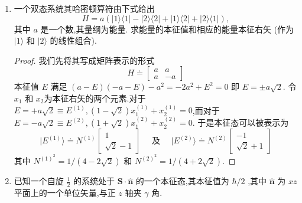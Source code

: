 \begin{enumerate}
$$	$$
	其中
	$$
	{S}_{x} = \frac{\hbar }{2}\left( {\left| {+\rangle \langle - }\right| + \left| {-\rangle \langle + }\right| }\right) ,\;{S}_{y} = \frac{i\hbar }{2}\left( {-\left| {+\rangle \langle - }\right| + \left| {-\rangle \langle + }\right| }\right) ,
	{S}_{z} = \frac{\hbar }{2}\left( {\left| {+\rangle \langle + }\right| - \left| {-\rangle \langle - }\right| }\right) .
	$$
	\begin{proof}
		本题仅需要理解各个符号的含义并带入即可,一个可以有一定作用的方法是令$\langle +|-\rangle=\langle -|+\rangle=0,\langle +|+\rangle=\langle -|-\rangle=1$,这样可以减少其中的运算量.
	\end{proof}
	\item 一个双态系统其哈密顿算符由下式给出
	$$
	H = a\left( {\left| {1\rangle \langle 1}\right| - \left| {2\rangle \langle 2}\right| + \left| {1\rangle \langle 2}\right| + \left| {2\rangle \langle 1}\right| }\right) ,
	$$
	其中 $a$ 是一个数,其量纲为能量. 求能量的本征值和相应的能量本征右矢 (作为 $|1\rangle$ 和 $|2\rangle$ 的线性组合).
	\begin{proof}	
		我们先将其写成矩阵表示的形式
		\begin{equation}
			H\doteq\left[\begin{array}{rr}a&a\\a&-a\end{array}\right]
		\end{equation}
		本征值 $E$ 满足 $( a- E) ( - a- E) - a^2= - 2a^2+ E^2= 0$ 即 $E= \pm a\sqrt {2}.$ 令$x_1$ 和 $x_2$为本征右矢的两个元素.对于$E=+a\sqrt{2}\equiv E^{(1)},(1-\sqrt{2})x_{1}^{(1)}+x_{2}^{(1)}=0$,而对于$E=-a\sqrt2\equiv E^{(2)},(1+\sqrt2)x_1^{(2)}+x_2^{(2)}=0.$ 于是本征态可以被表示为
		\begin{equation}
			\left.|E^{(1)}\rangle\doteq N^{(1)}\left[\begin{array}{c}1\\\sqrt{2}-1\end{array}\right.\right]\quad\text{ 及 }\quad|E^{(2)}\rangle\doteq N^{(2)}\left[\begin{array}{c}-1\\\sqrt{2}+1\end{array}\right]
		\end{equation}
		其中 $N^{(1)^2}=1/(4-2\sqrt{2})$ 和 $N^{(2)^2}=1/(4+2\sqrt{2}).$
	\end{proof}
	\item 已知一个自旋 $\frac{1}{2}$ 的系统处于 $\mathbf{S} \cdot \widehat{\mathbf{n}}$ 的一个本征态,其本征值为 $\hbar/2$ ,其中 $\widehat{\mathbf{n}}$ 为 ${xz}$ 平面上的一个单位矢量,与正 $z$ 轴夹 $\gamma$ 角.

\end{enumerate}
